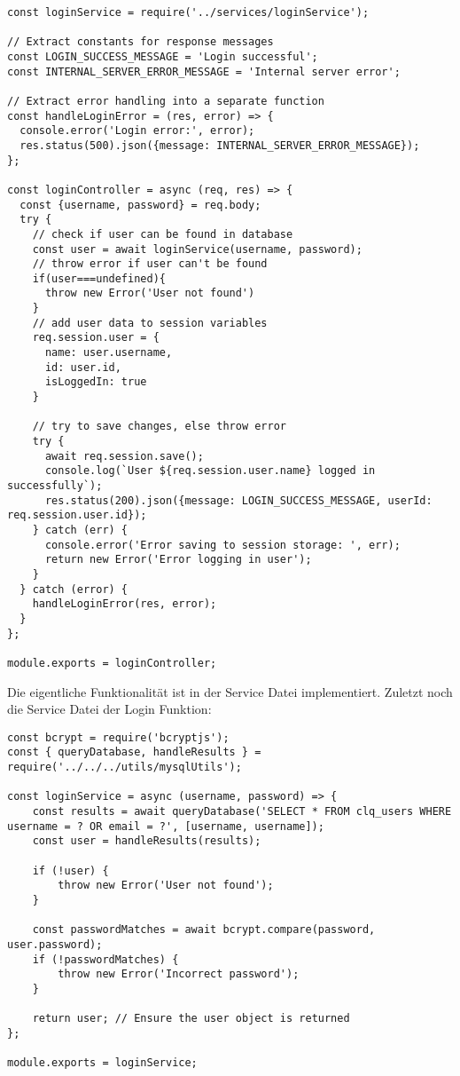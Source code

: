 \vspace{1em}
\begin{lstlisting}[label={lst:lst-login-controller}]
const loginService = require('../services/loginService');

// Extract constants for response messages
const LOGIN_SUCCESS_MESSAGE = 'Login successful';
const INTERNAL_SERVER_ERROR_MESSAGE = 'Internal server error';

// Extract error handling into a separate function
const handleLoginError = (res, error) => {
  console.error('Login error:', error);
  res.status(500).json({message: INTERNAL_SERVER_ERROR_MESSAGE});
};

const loginController = async (req, res) => {
  const {username, password} = req.body;
  try {
    // check if user can be found in database
    const user = await loginService(username, password);
    // throw error if user can't be found
    if(user===undefined){
      throw new Error('User not found')
    }
    // add user data to session variables
    req.session.user = {
      name: user.username,
      id: user.id,
      isLoggedIn: true
    }

    // try to save changes, else throw error
    try {
      await req.session.save();
      console.log(`User ${req.session.user.name} logged in successfully`);
      res.status(200).json({message: LOGIN_SUCCESS_MESSAGE, userId: req.session.user.id});
    } catch (err) {
      console.error('Error saving to session storage: ', err);
      return new Error('Error logging in user');
    }
  } catch (error) {
    handleLoginError(res, error);
  }
};

module.exports = loginController;
\end{lstlisting}
\vspace{1em}

Die eigentliche Funktionalität ist in der Service Datei implementiert.
Zuletzt noch die Service Datei der Login Funktion:

\vspace{1em}
\begin{lstlisting}[label={lst:lst-login-service}]
const bcrypt = require('bcryptjs');
const { queryDatabase, handleResults } = require('../../../utils/mysqlUtils');

const loginService = async (username, password) => {
    const results = await queryDatabase('SELECT * FROM clq_users WHERE username = ? OR email = ?', [username, username]);
    const user = handleResults(results);

    if (!user) {
        throw new Error('User not found');
    }

    const passwordMatches = await bcrypt.compare(password, user.password);
    if (!passwordMatches) {
        throw new Error('Incorrect password');
    }

    return user; // Ensure the user object is returned
};

module.exports = loginService;
\end{lstlisting}
\vspace{1em}


